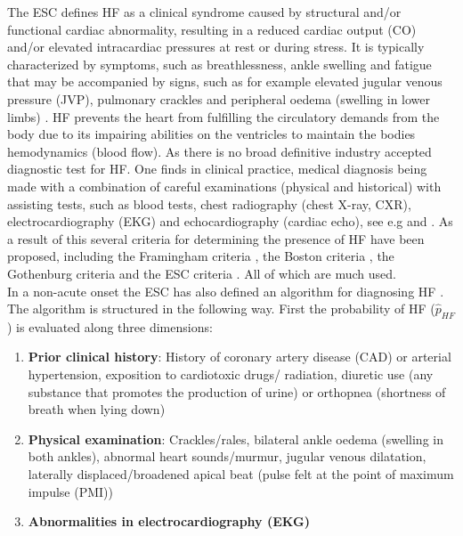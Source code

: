 \documentclass[../thesis.tex]{subfiles}
\begin{document}
\noindent The ESC defines HF as a clinical syndrome caused by structural and/or functional cardiac abnormality, resulting in a reduced cardiac output (CO) and/or elevated intracardiac pressures at rest or during stress. It is typically characterized by symptoms, such as breathlessness, ankle swelling and fatigue that may be accompanied by signs, such as for example elevated jugular venous pressure (JVP), pulmonary crackles and peripheral oedema (swelling in lower limbs) \citep{ponikowski2016}. HF prevents the heart from fulfilling the circulatory demands from the body due to its impairing abilities on the ventricles to maintain the bodies hemodynamics (blood flow). As there is no broad definitive industry accepted diagnostic test for HF. One finds in clinical practice, medical diagnosis being made with a combination of careful examinations (physical and historical) with assisting tests, such as blood tests, chest radiography (chest X-ray, CXR), electrocardiography (EKG) and echocardiography (cardiac echo), see e.g \cite{henein2010heart} and \cite{son2012decision}. As a result of this several criteria for determining the presence of HF have been proposed, including the Framingham criteria \citep{mckee1971natural}, the Boston criteria \citep{carlson1985analysis}, the Gothenburg criteria \citep{eriksson1987cardiac} and the ESC criteria \citep{swedberg2005guidelines} \citep{roger2010heart}. All of which are much used.\\
\indent In a non-acute onset the ESC has also defined an algorithm for diagnosing HF \citep{ponikowski2016}. The algorithm is structured in the following way. First the probability of HF ($\hat{p}_{HF}$) is evaluated along three dimensions: 
\begin{enumerate}[label=(\roman*)]
    \item \textbf{Prior clinical history}: History of coronary artery disease (CAD) or arterial hypertension, exposition to cardiotoxic drugs/ radiation, diuretic use (any substance that promotes the production of urine) or orthopnea (shortness of breath when lying down)
    \item \textbf{Physical examination}: Crackles/rales, bilateral ankle oedema (swelling in both ankles), abnormal heart sounds/murmur, jugular venous dilatation, laterally displaced/broadened apical beat (pulse felt at the point of maximum impulse (PMI))
    \item \textbf{Abnormalities in electrocardiography (EKG)}
\end{enumerate}
\end{document}
